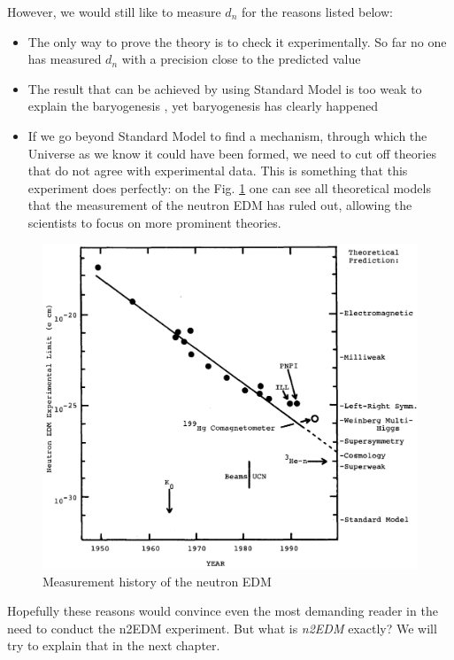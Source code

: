 However, we would still like to measure $d_n$ for the reasons listed below:
\begin{itemize}
	\item The only way to prove the theory is to check it experimentally. So far no one has measured $d_n$ with a precision close to the predicted value
	\item The result that can be achieved by using Standard Model is too weak to explain the baryogenesis \cite{Dubbers2011}, yet baryogenesis has clearly happened
	\item If we go beyond Standard Model to find a mechanism, through which the Universe as we know it could have been formed, we need to cut off theories that do not agree with experimental data. This is something that this experiment does perfectly: on the Fig. \ref{fig:edm_history} one can see all theoretical models that the measurement of the neutron EDM has ruled out, allowing the scientists to focus on more prominent theories.
\end{itemize}

\begin{figure}[h]
	\includegraphics[width=\textwidth]{img/history_of_nedm_measurements}
	\caption{Measurement history of the neutron EDM \cite{Golub1994}}
	\label{fig:edm_history}
\end{figure}

Hopefully these reasons would convince even the most demanding reader in the need to conduct the n2EDM experiment. But what is \textit{n2EDM} exactly? We will try to explain that in the next chapter.

